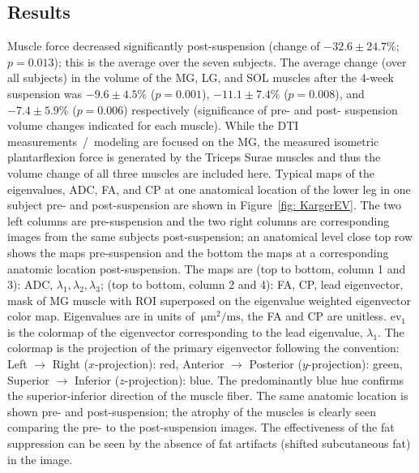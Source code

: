 \subsection{Results}
Muscle force decreased significantly post-suspension (change of $-32.6 \pm 24.7\%$; $p=0.013$); this is the average over the seven subjects. 
The average change (over all subjects) in the volume of the MG, LG, and SOL muscles after the 4-week suspension was $-9.6 \pm 4.5\%$ ($p=0.001$), $-11.1 \pm 7.4\%$ ($p=0.008$), and $-7.4 \pm 5.9\%$ ($p=0.006$) respectively (significance of pre- and post- suspension volume changes indicated for each muscle).
While the DTI measurements~/~modeling are focused on the MG, the measured isometric plantarflexion force is generated by the Triceps Surae muscles and thus the volume change of all three muscles are included here. 
Typical maps of the eigenvalues, ADC, FA, and CP at one anatomical location of the lower leg in one subject pre- and post-suspension are shown in Figure~\ref{fig: KargerEV}. 
The two left columns are pre-suspension and the two right columns are corresponding images from the same subjects post-suspension; 
an anatomical level close top row shows the maps pre-suspension and the bottom the maps at a corresponding anatomic location post-suspension. 
The maps are (top to bottom, column 1 and 3): ADC, $\lambda_1, \lambda_2, \lambda_3$; (top to bottom, column 2 and 4): FA, CP, lead eigenvector, mask of MG muscle with ROI superposed on the eigenvalue weighted eigenvector color map. 
Eigenvalues are in units of $\SI{}{\micro\meter^2 / \milli\second}$, the FA and CP are unitless. $\mathrm{ev}_1$ is the colormap of the eigenvector corresponding to the lead eigenvalue, $\lambda_1$. 
The colormap is the projection of the primary eigenvector following the convention: Left $\rightarrow$ Right ($x$-projection): red, Anterior $\rightarrow$ Posterior ($y$-projection): green, Superior $\rightarrow$ Inferior ($z$-projection): blue. 
The predominantly blue hue confirms the superior-inferior direction of the muscle fiber. 
The same anatomic location is shown pre- and post-suspension; 
the atrophy of the muscles is clearly seen comparing the pre- to the post-suspension images. 
The effectiveness of the fat suppression can be seen by the absence of fat artifacts (shifted subcutaneous fat) in the image.
